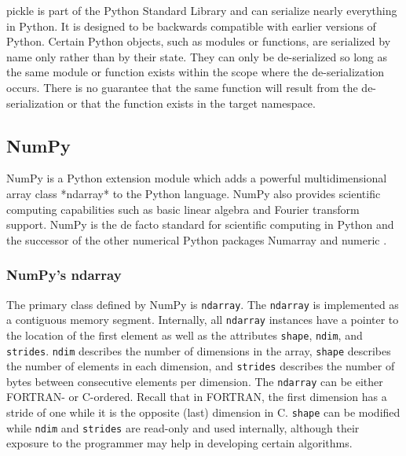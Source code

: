 \documentclass{sigplanconf}
\begin{document}
pickle is part of the Python Standard Library \cite{Lun01} and can serialize
nearly everything in Python. It is designed to be backwards compatible with
earlier versions of Python. Certain Python objects, such as modules or
functions, are serialized by name only rather than by their state. They can
only be de-serialized so long as the same module or function exists within the
scope where the de-serialization occurs. There is no guarantee that the same
function will result from the de-serialization or that the function exists in
the target namespace.

\subsection{NumPy}

NumPy \cite{Oli06} is a Python extension module which adds a powerful
multidimensional array class *ndarray* to the Python language. NumPy also
provides scientific computing capabilities such as basic linear algebra and
Fourier transform support. NumPy is the de facto standard for scientific
computing in Python and the successor of the other numerical Python packages
Numarray \cite{Dub96} and numeric \cite{Asc99}.

\subsubsection{NumPy's ndarray}

The primary class defined by NumPy is \verb=ndarray=. The \verb=ndarray= is
implemented as a contiguous memory segment. Internally, all \verb=ndarray=
instances have a pointer to the location of the first element as well as the
attributes \verb=shape=, \verb=ndim=, and \verb=strides=. \verb=ndim=
describes the number of dimensions in the array, \verb=shape= describes the
number of elements in each dimension, and \verb=strides= describes the number
of bytes between consecutive elements per dimension. The \verb=ndarray= can be
either FORTRAN- or C-ordered.  Recall that in FORTRAN, the first dimension has
a stride of one while it is the opposite (last) dimension in C. \verb=shape=
can be modified while \verb=ndim= and \verb=strides= are read-only and used
internally, although their exposure to the programmer may help in developing
certain algorithms.
\end{document}
